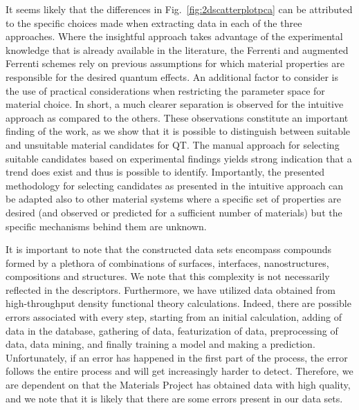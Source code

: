 \documentclass[superscriptaddress,unsortedaddress,
 amsmath,amssymb,
 aps,
]{revtex4-2}
\begin{document}
It seems likely that the differences in Fig.~\ref{fig:2dscatterplotpca} can be attributed to the specific choices made when extracting data in each of the three approaches. Where the insightful approach takes advantage of the experimental knowledge that is already available in the literature, the Ferrenti and augmented Ferrenti schemes 
rely on previous assumptions for which material properties are responsible for the desired quantum effects.   
An additional factor to consider is the use of practical considerations when restricting the parameter space for material choice. 
In short, a much clearer separation is observed for the intuitive approach as compared to the others. 
These observations constitute an important finding of the work, as we show that it is possible to distinguish between suitable and unsuitable material candidates for QT. 
The manual approach for selecting suitable candidates based on experimental findings yields strong indication that a trend does exist and thus is possible to identify. 
Importantly, the presented methodology for selecting candidates as presented in the intuitive approach can be adapted also to other material systems where a specific set of properties are desired (and observed or predicted for a sufficient number of materials) but the specific mechanisms behind them are unknown. 

It is important to note that the constructed data sets encompass compounds formed by a plethora of combinations of surfaces, interfaces, nanostructures, compositions and structures. We note that this complexity is not necessarily reflected in the descriptors. 
Furthermore, we have utilized data obtained from high-throughput density functional theory calculations. Indeed, there are possible errors associated with every step, starting from an initial calculation, adding of data in the database, gathering of data, featurization of data, preprocessing of data, data mining, and finally training a model and making a prediction. Unfortunately, if an error has happened in the first part of the process, the error follows the entire process and will get increasingly harder to detect. Therefore, we are dependent on that the Materials Project has obtained data with high quality, and we note that it is likely that there are some errors present in our data sets.
\end{document}

